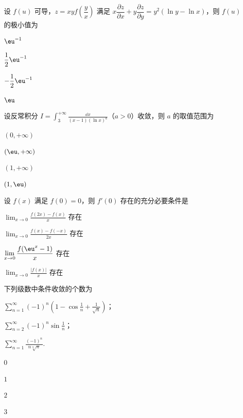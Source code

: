
\begin{question}[index=1]
设 $f(u)$ 可导，$z=xyf\!\left(\dfrac yx\right)$ 满足 $x\dfrac{\partial z}{\partial x}+y\dfrac{\partial z}{\partial y}=y^2(\ln y-\ln x)$，则 $f(u)$ 的极小值为
\begin{choices}[columns=2]
\item $\eu^{-1}$
\item $\dfrac12\eu^{-1}$
\item $-\dfrac12\eu^{-1}$
\item $\eu$
\end{choices}
\end{question}
\QuestionBreak

\begin{question}[index=2]
设反常积分 $\displaystyle I=\int_3^{+\infty}\frac{\dd x}{(x-1)(\ln x)^a}$（$a>0$）收敛，则 $a$ 的取值范围为
\begin{choices}[columns=4]
\item $(0,+\infty)$
\item $(\eu,+\infty)$
\item $(1,+\infty)$
\item $(1,\eu)$
\end{choices}
\end{question}
\QuestionBreak

\begin{question}[index=3]
设 $f(x)$ 满足 $f(0)=0$，则 $f'(0)$ 存在的充分必要条件是
\begin{choices}[columns=2]
\item $\displaystyle\lim_{x\to0}\frac{f(2x)-f(x)}x$ 存在
\item $\displaystyle\lim_{x\to0}\frac{f(x)-f(-x)}{2x}$ 存在
\item $\displaystyle\lim_{x\to0}\frac{f(\eu^x-1)}x$ 存在
\item $\displaystyle\lim_{x\to0}\frac{|f(x)|}x$ 存在
\end{choices}
\end{question}
\QuestionBreak

\begin{question}[index=4]
下列级数中条件收敛的个数为
\par{} $\displaystyle\sum_{n=1}^\infty(-1)^n\left(1-\cos\frac1n+\frac1{\sqrt n}\right)$；
\par{} $\displaystyle\sum_{n=2}^\infty(-1)^n\sin\frac1n$；
\par{} $\displaystyle\sum_{n=1}^\infty\frac{(-1)^n}{n\sqrt[n]n}$.
\begin{choices}[columns=4]
\item $0$
\item $1$
\item $2$
\item $3$
\end{choices}
\end{question}
\QuestionBreak

